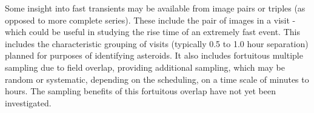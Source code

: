 Some insight into fast transients may be available from image pairs  or triples (as opposed to more complete series).  These include the pair of images in a visit - which could be useful in studying the rise time of an extremely fast event.  This includes the characteristic grouping of visits (typically 0.5 to 1.0 hour separation) planned for purposes of identifying asteroids.  It also includes fortuitous multiple sampling due to field overlap, providing additional sampling, which may be random or systematic, depending on the scheduling, on a time scale of minutes to hours.  The sampling benefits of this fortuitous overlap have not yet been investigated.


\navigationbar







